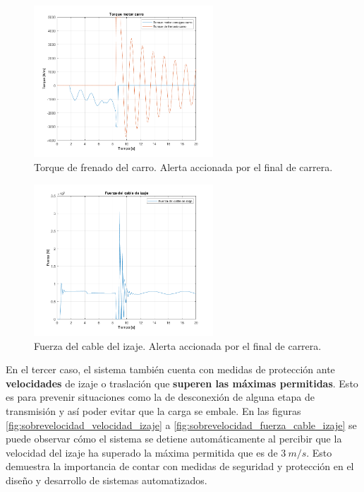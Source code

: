 \documentclass[11pt]{article}
\begin{document}
\begin{figure}[!h]
	\centering
	\includegraphics[width=0.6\textwidth]{images/Freno_fin_de_carrera/torque_carro.png}
	\caption{Torque de frenado del carro. Alerta accionada por el final de carrera.}
	\label{fig:final_carrera_torque_motor_carro}
\end{figure}

\begin{figure}[!h]
	\centering
	\includegraphics[width=0.6\textwidth]{images/Freno_fin_de_carrera/fuerza_izaje.png}
	\caption{Fuerza del cable del izaje. Alerta accionada por el final de carrera.}
	\label{fig:final_carrera_fuerza_cable_izaje}
\end{figure}

\newpage

En el tercer caso, el sistema también cuenta con medidas de protección ante \textbf{velocidades} de izaje o traslación que \textbf{superen las máximas permitidas}. Esto es para prevenir situaciones como la de desconexión de alguna etapa de transmisión y así poder evitar que la carga se embale. En las figuras \ref{fig:sobrevelocidad_velocidad_izaje} a \ref{fig:sobrevelocidad_fuerza_cable_izaje} se puede observar cómo el sistema se detiene automáticamente al percibir que la velocidad del izaje ha superado la máxima permitida que es de $3\ m/s$. Esto demuestra la importancia de contar con medidas de seguridad y protección en el diseño y desarrollo de sistemas automatizados.
\end{document}
